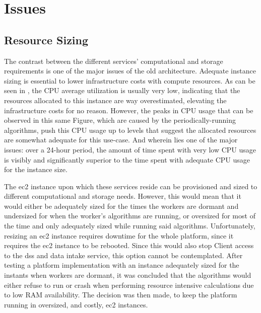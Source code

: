 \section{Issues}\label{methodology:s:issues}

\subsection{Resource Sizing}\label{methodology:ss:resource sizing}



The contrast between the different services' computational and storage requirements is one of the major issues of the old architecture. Adequate instance sizing is essential to lower infrastructure costs with compute resources. As can be seen in , the CPU average utilization is usually very low, indicating that the resources allocated to this instance are way overestimated, elevating the infrastructure costs for no reason. However, the peaks in CPU usage that can be observed in this same Figure, which are caused by the periodically-running algorithms, push this CPU usage up to levels that suggest the allocated resources are somewhat adequate for this use-case. And wherein lies one of the major issues: over a 24-hour period, the amount of time spent with very low CPU usage is visibly and significantly superior to the time spent with adequate CPU usage for the instance size. 



The \gls{ec2} instance upon which these services reside can be provisioned and sized to different computational and storage needs. However, this would mean that it would either be adequately sized for the times the workers are dormant and undersized for when the worker's algorithms are running, or oversized for most of the time and only adequately sized while running said algorithms. Unfortunately, resizing an \gls{ec2} instance requires downtime for the whole platform, since it requires the \gls{ec2} instance to be rebooted. Since this would also stop Client access to the \gls{dss} and data intake service, this option cannot be contemplated. After testing a platform implementation with an instance adequately sized for the instants when workers are dormant, it was concluded that the algorithms would either refuse to run or crash when performing resource intensive calculations due to low RAM availability. The decision was then made, to keep the platform running in oversized, and costly, \gls{ec2} instances.

